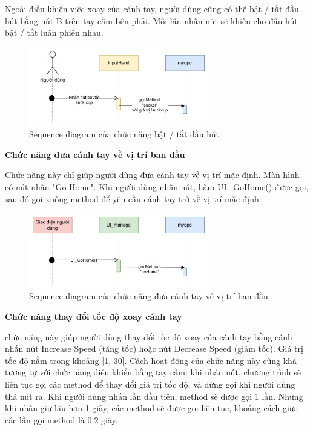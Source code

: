 Ngoài điều khiển việc xoay của cánh tay, người dùng cũng có thể bật / tắt đầu hút bằng nút B trên tay cầm bên phải. Mỗi lần nhấn nút sẽ khiến cho đầu hút bật / tắt luân phiên nhau.

\begin{figure}[H]
    \centering
    \includegraphics[width=0.7\textwidth]{Images/Implementation/VRapp/VR_suckcup.jpg}
    \caption{Sequence diagram của chức năng bật / tắt đầu hút}
    \label{fig:seq_sucker}
\end{figure}

\textbf{Chức năng đưa cánh tay về vị trí ban đầu} 

Chức năng này chỉ giúp người dùng đưa cánh tay về vị trí mặc định. Màn hình có nút nhấn "Go Home". Khi người dùng nhấn nút, hàm UI\_GoHome() được gọi, sau đó gọi xuống method để yêu cầu cánh tay trở về vị trí mặc định.

\begin{figure}[H]
    \centering
    \includegraphics[width=0.7\textwidth]{Images/Implementation/VRapp/VR_gohome.jpg}
    \caption{Sequence diagram của chức năng đưa cánh tay về vị trí ban đầu}
    \label{fig:seq_gohome}
\end{figure}

\textbf{Chức năng thay đổi tốc độ xoay cánh tay} 

chức năng này giúp người dùng thay đổi tốc độ xoay của cánh tay bằng cánh nhấn nút Increase Speed (tăng tốc) hoặc nút Decrease Speed (giảm tốc). Giá trị tốc độ nằm trong khoảng [1, 30]. Cách hoạt động của chức năng này cũng khá tương tự với chức năng điều khiển bằng tay cầm: khi nhấn nút, chương trình sẽ liên tục gọi các method để thay đổi giá trị tốc độ, và dừng gọi khi người dùng thả nút ra. Khi người dùng nhấn lần đầu tiên, method sẽ được gọi 1 lần. Nhưng khi nhấn giữ lâu hơn 1 giây, các method sẽ được gọi liên tục, khoảng cách giữa các lần gọi method là 0.2 giây. 

